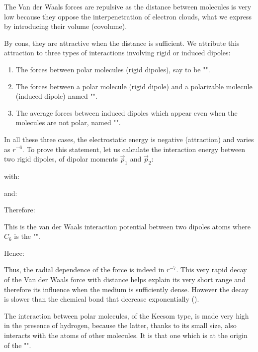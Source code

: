 	The Van der Waals forces are repulsive as the distance between molecules is very low because they oppose the interpenetration of electron clouds, what we express by introducing their volume (covolume).

	By cons, they are attractive when the distance is sufficient. We attribute this attraction to three types of interactions involving rigid or induced dipoles:
	\begin{enumerate}
		\item The forces between polar molecules (rigid dipoles), say to be "".

		\item The forces between a polar molecule (rigid dipole) and a polarizable molecule (induced dipole) named "".

		\item	The average forces between induced dipoles which appear even when the molecules are not polar, named "".
	\end{enumerate}
	In all these three cases, the electrostatic energy is negative (attraction) and varies as $r^{-6}$. To prove this statement, let us calculate the interaction energy between two rigid dipoles, of dipolar moments $\vec{p}_1$ and $\vec{p}_2$:
	
	with:
	
	and:
	
	Therefore:
	
	This is the van der Waals interaction potential between two dipoles atoms where $C_6$ is the "".
	
	Hence:
	
	Thus, the radial dependence of the force is indeed in $r^{-7}$. This very rapid decay of the Van der Waals force with distance helps explain its very short range and therefore its influence when the medium is sufficiently dense. However the decay is slower than the chemical bond that decrease exponentially ().
	\begin{tcolorbox}[title=Remark,colframe=black,arc=10pt]
	The interaction between polar molecules, of the Keesom type, is made very high in the presence of hydrogen, because the latter, thanks to its small size, also interacts with the atoms of other molecules. It is that one which is at the origin of the "".
	\end{tcolorbox}
	
